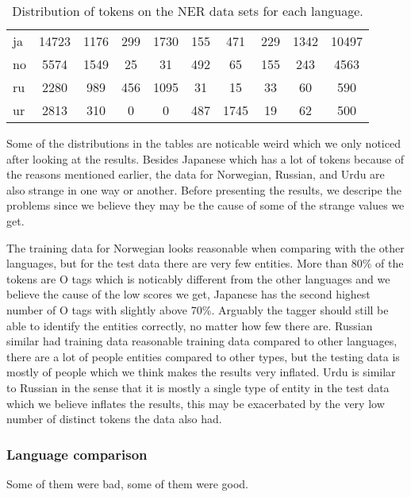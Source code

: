 \begin{table}[h!]
\begin{tabular}{l c c c c c c c c c}
        ja  &14723 & 1176 &
        299 & 1730 &  155 &  471 &  229 & 1342 &10497 \\

        no  & 5574 & 1549 &
         25 &   31 &  492 &   65 &  155 &  243 & 4563 \\

        ru  & 2280 &  989 &
        456 & 1095 &   31 &   15 &   33 &   60 &  590 \\

        ur  & 2813 &  310 &
          0 &    0 &  487 & 1745 &   19 &   62 &  500 \\
        \bottomrule
    \end{tabular}
    \caption{Distribution of tokens on the NER data sets for each language.
    }\label{table:token-distribution-ner}
\end{table}

Some of the distributions in the tables are noticable weird which we only
noticed after looking at the results. Besides Japanese which has a lot of tokens
because of the reasons mentioned earlier, the data for Norwegian, Russian, and
Urdu are also strange in one way or another. Before presenting the results, we
descripe the problems since we believe they may be the cause of some of the
strange values we get.

The training data for Norwegian looks reasonable when comparing with the other
languages, but for the test data there are very few entities. More than 80\% of
the tokens are O tags which is noticably different from the other languages and
we believe the cause of the low scores we get, Japanese has the second highest
number of O tags with slightly above 70\%. Arguably the tagger should still be
able to identify the entities correctly, no matter how few there are. Russian
similar had training data reasonable training data compared to other languages,
there are a lot of people entities compared to other types, but the testing data
is mostly of people which we think makes the results very inflated. Urdu is
similar to Russian in the sense that it is mostly a single type of entity in the
test data which we believe inflates the results, this may be exacerbated by the
very low number of distinct tokens the data also had. 

\subsubsection{Language comparison}

Some of them were bad, some of them were good.


